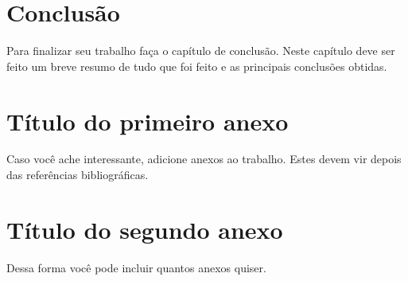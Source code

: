 \documentclass[12pt,a4paper,header]{abnt}
\begin{document}
\chapter{Conclusão}

Para finalizar seu trabalho faça o capítulo de conclusão. Neste capítulo deve ser feito um breve resumo de tudo que foi feito e as principais conclusões obtidas.






\anexo



\chapter{Título do primeiro anexo}

Caso você ache interessante, adicione anexos ao trabalho. Estes devem vir depois das referências bibliográficas. 



\chapter{Título do segundo anexo}

Dessa forma você pode incluir quantos anexos quiser. 
\end{document}
